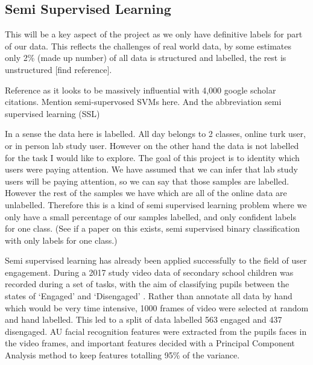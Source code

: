 \documentclass{article}
\begin{document}


\subsection{Semi Supervised Learning}
This will be a key aspect of the project as we only have definitive labels for part of our data.
This reflects the challenges of real world data, by some estimates only 2\% (made up number) of all data is structured and labelled, the rest is unstructured [find reference].

Reference \cite{zhu2005semi} as it looks to be massively influential with 4,000 google scholar citations.
Mention semi-supervosed SVMs here. 
And the abbreviation semi supervised learning (SSL)


In a sense the data here is labelled.
All day belongs to 2 classes, online turk user, or in person lab study user.
However on the other hand the data is not labelled for the task I would like to explore.
The goal of this project is to identity which users were paying attention.
We have assumed that we can infer that lab study users will be paying attention, so we can say that those samples are labelled.
However the rest of the samples we have which are all of the online data are unlabelled.
Therefore this is a kind of semi supervised learning problem where we only have a small percentage of our samples labelled, and only confident labels for one class.
(See if a paper on this exists, semi supervised binary classification with only labels for one class.)

Semi supervised learning has already been applied successfully to the field of user engagement.
During a 2017 study video data of secondary school children was recorded during a set of tasks, with the aim of classifying pupils between the states of `Engaged' and `Disengaged' \cite{nezami2017semi}.
Rather than annotate all data by hand which would be very time intensive, 1000 frames of video were selected at random and hand labelled.
This led to a split of data labelled 563 engaged and 437 disengaged.
AU facial recognition features were extracted from the pupils faces in the video frames, and important features decided with a Principal Component Analysis method to keep features totalling 95\% of the variance.
\end{document}

